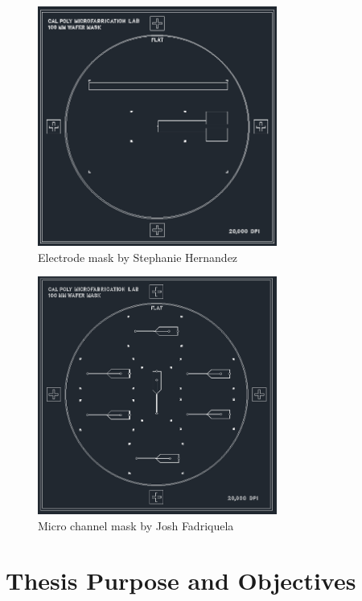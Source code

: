 \begin{figure}[h]
    \centering
    \includegraphics[width=0.7\textwidth]{images/electrode_mask.png}
    \caption{Electrode mask by Stephanie Hernandez \cite{hernandez_single_2009-1}}
    \label{fig:electrode_mask}
\end{figure}

\begin{figure}
    \centering
    \includegraphics[width=0.7\textwidth]{images/micro_channel_mask.png}
    \caption{Micro channel mask by Josh Fadriquela \cite{fadriquela_design_2009-1}}
    \label{fig:my_label}
\end{figure}

\section[Objectives]{Thesis Purpose and Objectives}